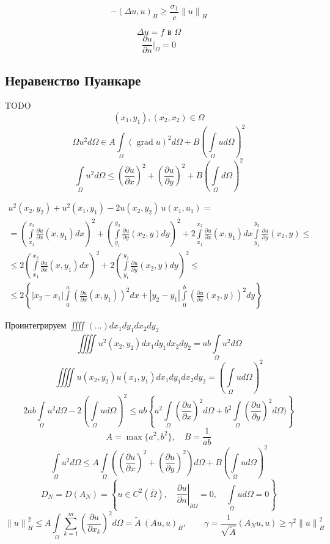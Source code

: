 \documentclass[12pt, a4paper]{article}
\newcommand{\Int}{\int\limits}
\newcommand{\Sum}{\sum\limits}
\begin{document}
\[ -(\Delta u, u)_H \geq \frac{\sigma_1}{c} {\|u\|}_H \]

\[ \Delta u = f \textrm{ в } \Omega \]
\[ \frac{\partial u}{\partial  n}|_{\Omega} = 0 \]

\subsection{Неравенство Пуанкаре}

TODO
\[ (x_1, y_1), (x_2, x_2) \in \Omega \]
\[ \Omega u^2 d \Omega \in A \Int_{\Omega}^{} (\operatorname{grad} u)^2 d\Omega + B(\Int_{\Omega}^{}u d\Omega)^2\]
\[ \Int_{\Omega}^{} u^2 d\Omega \leq (\frac{\partial  u }{\partial x})^2 + (\frac{\partial  u }{\partial y})^2 + B(\Int_{\Omega}^{} d\Omega)^2 \]

\begin{multline*}
	u^2 (x_2, y_2) + u^2(x_1, y_1) - 2u(x_2, y_2) \, u(x_1, u_1) = \\
	= {\left( \Int_{x_1}^{x_2} \frac{\partial u}{\partial x} (x, y_1) dx \right)}^2 + {\left( \Int_{y_1}^{y_2} \frac{\partial u}{\partial y}(x_2, y) dy \right)}^2 + 2\Int_{x_1}^{x_2} \frac{\partial u}{\partial x} (x, y_1)dx \Int_{y_1}^{y_2} \frac{\partial u}{\partial y} (x_2, y) \leq \\
	\leq 2 {\left( \Int_{x_1}^{x_2} \frac{\partial u}{\partial x} (x, y_1) dx \right)}^2 + 2 {\left( \Int_{y_1}^{y_2} \frac{\partial u}{\partial y}(x_2, y) dy \right)}^2 \leq \\
	\leq 2 \left\{ |x_2-x_1| \Int_{0}^{a} {\left( \frac{\partial u}{\partial x}(x, y_1) \right)}^2 dx + |y_2-y_1| \Int_{0}^{b} {\left( \frac{\partial u}{\partial x}(x_2, y) \right)}^2 dy \right\}
\end{multline*}

Проинтегрируем $\iiiint (...) dx_1 dy_1 dx_2 dy_2$
\[ \iiiint u^2 (x_2, y_2) dx_1 dy_1 dx_2 dy_2 = ab \Int_{\Omega}^{} u^2 d\Omega \]
\[ \iiiint u(x_2, y_2) u(x_1, y_1) dx_1 dy_1 dx_2 dy_2 = {\left( \Int_{\Omega}^{} u d \Omega \right)}^2 \]
\[ 2 ab \Int_{\Omega}^{} u^2 d\Omega -2 {\left(\Int_{\Omega}^{} u d\Omega \right)}^2 \leq ab \left\{a^2 \Int_{\Omega}^{} {\left(\frac{\partial u}{\partial x}\right)}^2 d\Omega + b^2 \Int_{\Omega}^{} {\left(\frac{\partial u}{\partial y}\right)}^2 d\Omega) \right\} \]
\[ A = \max \{a^2, b^2\}, \quad B = \frac{1}{ab} \]
\[ \Int_{\Omega} u^2 d\Omega \leq A \Int_{\Omega} \left( {\left(\frac{\partial u }{\partial x}\right)}^2 + {\left(\frac{\partial u }{\partial y}\right)}^2 \right) d\Omega + B {\left(\Int_{\Omega} u d\Omega \right)}^2 \]
\[ D_N = D(A_N) = \left\{ u \in C^2(\overline{\Omega}), \quad {\left. \frac{\partial u}{\partial n} \right|}_{\partial  \Omega} = 0, \quad \Int_{\Omega}^{} u d\Omega = 0 \right\} \]
\[ {\|u\|}^2_H \leq A \Int_{\Omega}^{} \Sum_{k=1}^{m} {\left(\frac{\partial u}{\partial x_k}\right)}^2 d\Omega = \widetilde{A} \ {(Au, u)}_H, \qquad \gamma = \frac{1}{\sqrt{\widetilde{A}}} (A_Nu, u) \geq \gamma^2 {\|u\|}^2_H\]
\end{document}
